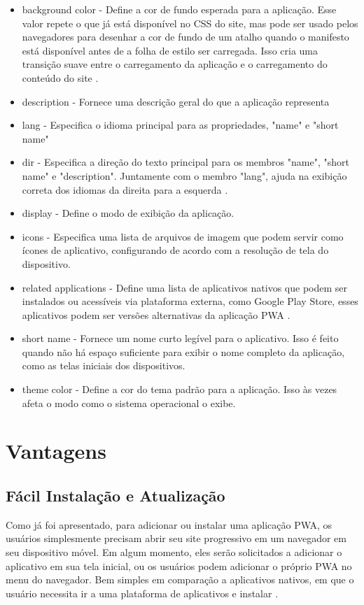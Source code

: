 \begin{itemize}
	\item background color - Define a cor de fundo esperada para a aplicação. Esse valor repete o que já está disponível no CSS do site, mas pode ser usado pelos navegadores para desenhar a cor de fundo de um atalho quando o manifesto está disponível antes de a folha de estilo ser carregada. Isso cria uma transição suave entre o carregamento da aplicação e o carregamento do conteúdo do site \cite{manifestfile}.
	\item description - Fornece uma descrição geral do que a aplicação representa
	\item lang - Especifica o idioma principal para as propriedades, "name" e "short name"
	\item dir - Especifica a direção do texto principal para os membros "name", "short name" e "description". Juntamente com o membro "lang", ajuda na exibição correta dos idiomas da direita para a esquerda \cite{manifestfile}.
	\item display - Define o modo de exibição da aplicação.
	\item icons - Especifica uma lista de arquivos de imagem que podem servir como ícones de aplicativo, configurando de acordo com a resolução de tela do dispositivo.
	\item related applications - Define uma lista de aplicativos nativos que podem ser instalados ou acessíveis via plataforma externa, como Google Play Store, esses aplicativos podem ser versões alternativas da aplicação \ac{PWA} \cite{manifestfile}.
	\item short name - Fornece um nome curto legível para o aplicativo. Isso é feito quando não há espaço suficiente para exibir o nome completo da aplicação, como as telas iniciais dos dispositivos.
	\item theme color - Define a cor do tema padrão para a aplicação. Isso às vezes afeta o modo como o sistema operacional o exibe.
\end{itemize}

\section{Vantagens}
\subsection{Fácil Instalação e Atualização}
Como já foi apresentado, para adicionar ou instalar uma aplicação \ac{PWA}, os usuários simplesmente precisam abrir seu site progressivo em um navegador em seu dispositivo móvel. Em algum momento, eles serão solicitados a adicionar o aplicativo em sua tela inicial, ou os usuários podem adicionar o próprio \ac{PWA} no menu do navegador. Bem simples em comparação a aplicativos nativos, em que o usuário necessita ir a uma plataforma de aplicativos e instalar \cite{pwabenefits}.

